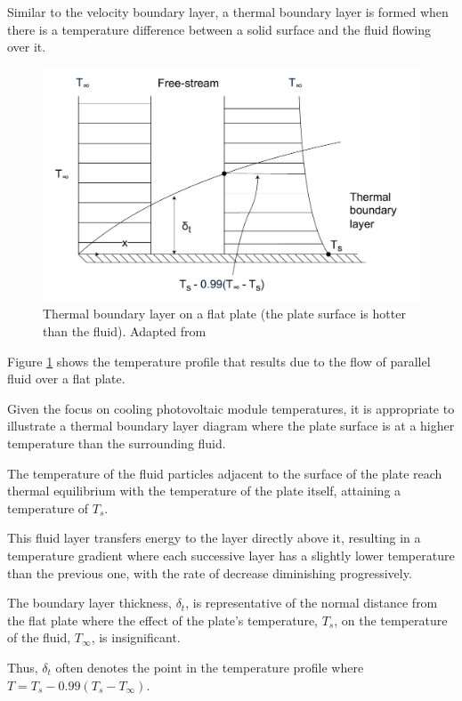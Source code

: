 Similar to the velocity boundary layer, a thermal boundary layer is formed when there is a temperature difference between a solid surface and the fluid flowing over it.\par

\begin{figure}[ht]
    \centering
    \includegraphics[width=0.75\linewidth]{Figures/thermal_boundary_layer.pdf}
    \caption{Thermal boundary layer on a flat plate (the plate surface is hotter than the fluid). Adapted from \cite{Cengel2014FundamentalsConvection}}
    \label{fig:thermal_boundary_layer}
\end{figure}

Figure \ref{fig:thermal_boundary_layer} shows the temperature profile that results due to the flow of parallel fluid over a flat plate.\par
Given the focus on cooling photovoltaic module temperatures, it is appropriate to illustrate a thermal boundary layer diagram where the plate surface is at a higher temperature than the surrounding fluid.\vspace{0.5em}

The temperature of the fluid particles adjacent to the surface of the plate reach thermal equilibrium with the temperature of the plate itself, attaining a temperature of $T_s$.\par
This fluid layer transfers energy to the layer directly above it, resulting in a temperature gradient where each successive layer has a slightly lower temperature than the previous one, with the rate of decrease diminishing progressively.\par
The boundary layer thickness, $\delta_t$, is representative of the normal distance from the flat plate where the effect of the plate's temperature, $T_s$, on the temperature of the fluid, $T_\infty$, is insignificant.\par
Thus, $\delta_t$ often denotes the point in the temperature profile where $T = T_s -0.99(T_s -T_\infty)$.\par

